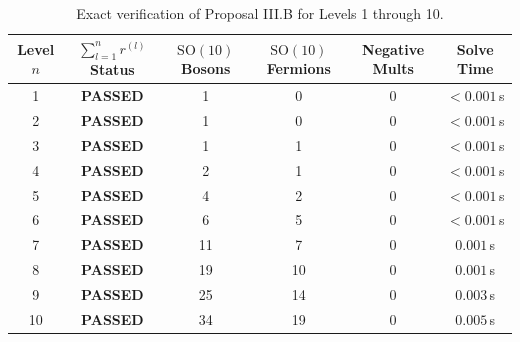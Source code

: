 \documentclass[11pt,a4paper]{article}
\begin{document}
\begin{table}[h!]
\centering
\begin{tabular}{@{}cccccc@{}}
\toprule
Level $n$ & $\sum_{l=1}^n r^{(l)}$ Status & $\mathrm{SO}(10)$ Bosons & $\mathrm{SO}(10)$ Fermions & Negative Mults & Solve Time \\
\midrule
1 & \textbf{PASSED} & 1 & 0 & 0 & $<0.001$\,s \\
2 & \textbf{PASSED} & 1 & 0 & 0 & $<0.001$\,s \\
3 & \textbf{PASSED} & 1 & 1 & 0 & $<0.001$\,s \\
4 & \textbf{PASSED} & 2 & 1 & 0 & $<0.001$\,s \\
5 & \textbf{PASSED} & 4 & 2 & 0 & $<0.001$\,s \\
6 & \textbf{PASSED} & 6 & 5 & 0 & $<0.001$\,s \\
7 & \textbf{PASSED} & 11 & 7 & 0 & $0.001$\,s \\
8 & \textbf{PASSED} & 19 & 10 & 0 & $0.001$\,s \\
9 & \textbf{PASSED} & 25 & 14 & 0 & $0.003$\,s \\
10 & \textbf{PASSED} & 34 & 19 & 0 & $0.005$\,s \\
\bottomrule
\end{tabular}
\caption{Exact verification of Proposal III.B for Levels 1 through 10.}
\end{table}
\end{document}
